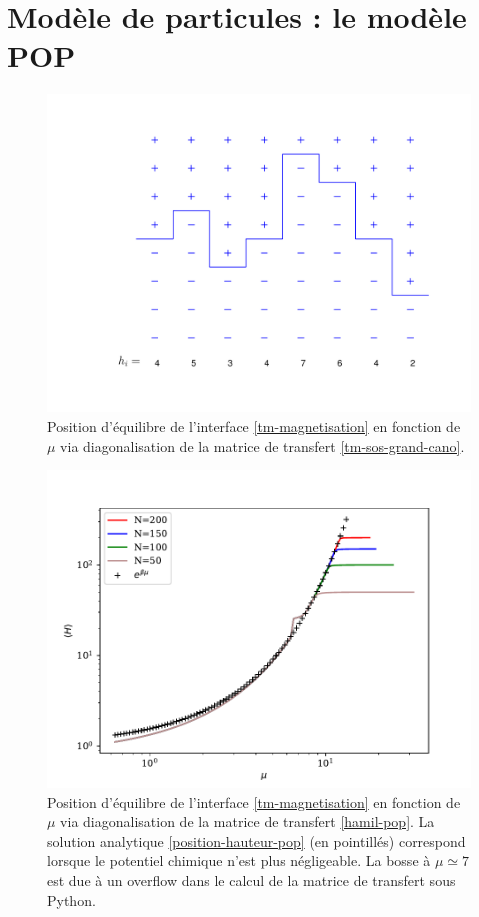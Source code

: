 	\section{Modèle de particules : le modèle POP}

\begin{figure}[h]
	\centering
	\includegraphics[width=0.7\linewidth]{isingtosos/figure-sos.pdf}
	\caption{Position d'équilibre de l'interface \ref{tm-magnetisation} en fonction de $\mu$ via diagonalisation de la matrice de transfert \ref{tm-sos-grand-cano}.}
	\label{figure-pop}
\end{figure}	
\begin{figure}
	\centering
	\includegraphics[width=0.5\linewidth]{isingtosos/hauteur-tm-pop.pdf}
	\caption{Position d'équilibre de l'interface \ref{tm-magnetisation} en fonction de $\mu$ via diagonalisation de la matrice de transfert \ref{hamil-pop}. La solution analytique \ref{position-hauteur-pop} (en pointillés) correspond lorsque le potentiel chimique n'est plus négligeable. La bosse à $\mu \simeq 7$ est due à un overflow dans le calcul de la matrice de transfert sous Python.}
	\label{figure-pop}
\end{figure}
	
